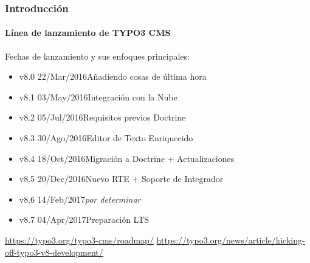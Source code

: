 \begin{frame}[fragile]
	\frametitle{Introducción}
	\framesubtitle{Línea de lanzamiento de TYPO3 CMS}

	Fechas de lanzamiento y sus enfoques principales:

	\begin{itemize}

		\item v8.0 \tabto{1.1cm}22/Mar/2016\tabto{3.4cm}Añadiendo cosas de última hora
		\item v8.1 \tabto{1.1cm}03/May/2016\tabto{3.4cm}Integración con la Nube
		\item v8.2 \tabto{1.1cm}05/Jul/2016\tabto{3.4cm}Requisitos previos Doctrine
		\item v8.3 \tabto{1.1cm}30/Ago/2016\tabto{3.4cm}Editor de Texto Enriquecido
		\item v8.4 \tabto{1.1cm}18/Oct/2016\tabto{3.4cm}Migración a Doctrine + Actualizaciones
		\item
			\begingroup
				\color{typo3orange}
					v8.5 \tabto{1.1cm}20/Dec/2016\tabto{3.4cm}Nuevo RTE + Soporte de Integrador
			\endgroup
		\item v8.6 \tabto{1.1cm}14/Feb/2017\tabto{3.4cm}\textit{por determinar}
		\item v8.7 \tabto{1.1cm}04/Apr/2017\tabto{3.4cm}Preparación LTS

	\end{itemize}

	\smaller
		\url{https://typo3.org/typo3-cms/roadmap/}\newline
		\url{https://typo3.org/news/article/kicking-off-typo3-v8-development/}
	\normalsize

\end{frame}

